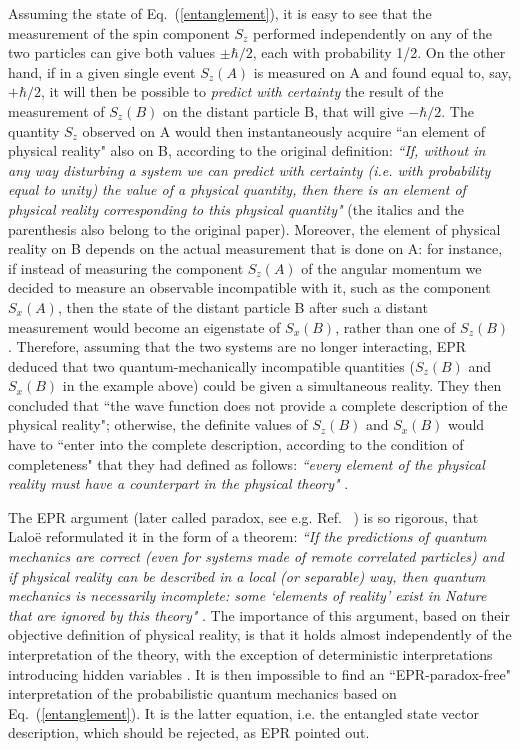 \documentclass[aps,prl,showkeys,showpacs,preprint,groupedaddress]{revtex4}
\begin{document}
Assuming the state of Eq.~(\ref{entanglement}), it is easy to see
that the measurement of the spin component $S_z$ performed
independently on any of the two particles can give both values
$\pm\hbar/2$, each with probability 1/2. On the other hand, if in
a given single event $S_z(A)$ is measured on A and found equal to,
say, $+\hbar/2$, it will then be possible to {\it predict with
certainty} the result of the measurement of $S_z(B)$ on the
distant particle B, that will give $-\hbar/2$. The quantity $S_z$
observed on A would then instantaneously acquire ``an element of
physical reality" also on B, according to the original definition:
{\it ``If, without in any way disturbing a system we can predict
with certainty (i.e. with probability equal to unity) the value
of a physical quantity, then there is an element of physical
reality corresponding to this physical quantity"} \cite{EPR} (the
italics and the parenthesis also belong to the original paper).
Moreover, the element of physical reality on B depends on the
actual measurement that is done on A: for instance, if instead of
measuring the component $S_z(A)$ of the angular momentum we
decided to measure an observable incompatible with it, such as the
component $S_x(A)$, then the state of the distant particle B after
such a distant measurement would become an eigenstate of $S_x(B)$,
rather than one of $S_z(B)$. Therefore, assuming that the two
systems are no longer interacting, EPR deduced that two
quantum-mechanically incompatible quantities ($S_z(B)$ and
$S_x(B)$ in the example above) could be given a simultaneous
reality. They then concluded that ``the wave function does not
provide a complete description of the physical reality";
otherwise, the definite values of $S_z(B)$ and $S_x(B)$ would have
to ``enter into the complete description, according to the
condition of completeness" that they had defined as follows: {\it
``every element of the physical reality must have a counterpart in
the physical theory"} \cite{EPR}.

The EPR argument (later called paradox, see e.g. Ref.~
\cite{Einstein}) is so rigorous, that Lalo\"e reformulated it in
the form of a theorem: {\it ``If the predictions of quantum
mechanics are correct (even for systems made of remote correlated
particles) and if physical reality can be described in a local (or
separable) way, then quantum mechanics is necessarily incomplete:
some `elements of reality' exist in Nature that are ignored by
this theory"} \cite{Laloe}. The importance of this argument, based
on their objective definition of physical reality, is that it
holds almost independently of the interpretation of the theory,
with the exception of deterministic interpretations introducing
hidden variables \cite{Laloe}. It is then impossible to find an
``EPR-paradox-free" interpretation of the probabilistic quantum
mechanics based on Eq.~(\ref{entanglement}). It is the latter
equation, i.e. the entangled state vector description, which
should be rejected, as EPR pointed out.
\end{document}
